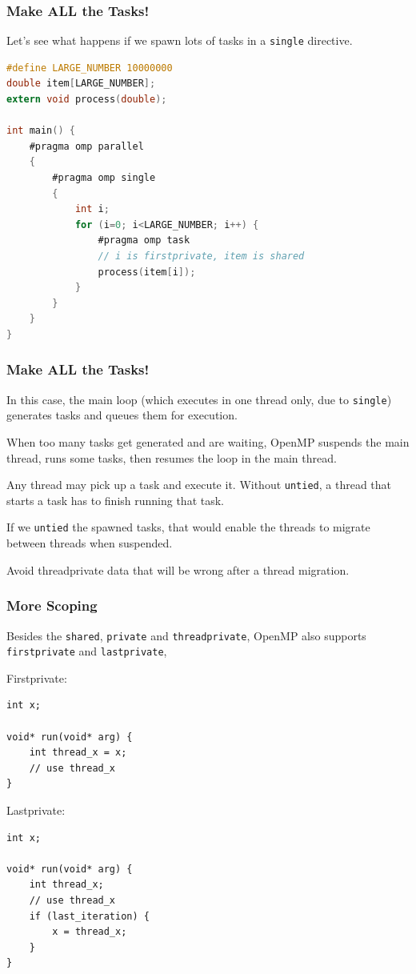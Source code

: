 \begin{frame}[fragile]
\frametitle{Make ALL the Tasks!}

Let's see what happens
if we spawn lots of tasks in a {\tt single} directive.

  \begin{lstlisting}[language=C]
#define LARGE_NUMBER 10000000
double item[LARGE_NUMBER];
extern void process(double);

int main() {
    #pragma omp parallel
    {
        #pragma omp single
        {
            int i;
            for (i=0; i<LARGE_NUMBER; i++) {
                #pragma omp task
                // i is firstprivate, item is shared
                process(item[i]);
            }
        }
    }
}
  \end{lstlisting}

\end{frame}


\begin{frame}[fragile]
\frametitle{Make ALL the Tasks!}

In this case, the main loop (which executes in one thread only, due to {\tt single}) generates tasks and queues them for execution.

When too many tasks get generated and are waiting, OpenMP suspends the main thread, runs some tasks, then resumes the loop in the main thread.

Any thread may pick up a task and execute it. Without {\tt untied}, a thread that starts a task has to finish running that task.

If we {\tt untied} the spawned tasks, that would enable the threads to
migrate between threads when suspended.

Avoid threadprivate data that
will be wrong after a thread migration.

\end{frame}


\begin{frame}[fragile]
\frametitle{More Scoping}

Besides the {\tt shared}, {\tt private} and {\tt threadprivate}, OpenMP also 
supports {\tt firstprivate} and {\tt lastprivate},

Firstprivate:
  \begin{lstlisting}
int x;

void* run(void* arg) {
    int thread_x = x;
    // use thread_x
}
  \end{lstlisting}


Lastprivate:
  \begin{lstlisting}
int x;

void* run(void* arg) {
    int thread_x;
    // use thread_x
    if (last_iteration) {
        x = thread_x;
    }
}
  \end{lstlisting}

\end{frame}


